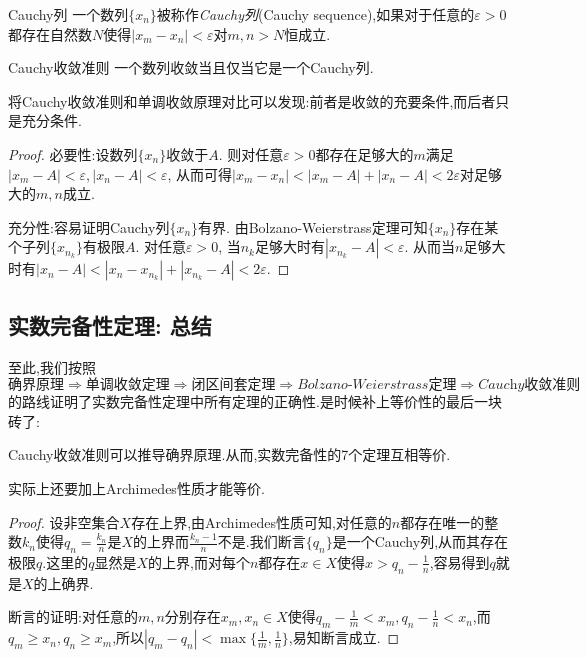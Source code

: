 \begin{definition}{Cauchy列}
	一个数列$\{ x_n \}$被称作\textit{Cauchy列}(Cauchy sequence),如果对于任意的$\varepsilon >0$都存在自然数$N$使得$|x_m-x_n|<\varepsilon$对$m,n>N$恒成立.
\end{definition}

\begin{theorem}{Cauchy收敛准则}
	一个数列收敛当且仅当它是一个Cauchy列.
\end{theorem}
\begin{remark}
	将Cauchy收敛准则和单调收敛原理对比可以发现:前者是收敛的充要条件,而后者只是充分条件.
\end{remark}
\begin{proof}
	必要性:设数列$\{ x_n \}$收敛于$A$. 则对任意$\varepsilon >0$都存在足够大的$m$满足$|x_m-A|<\varepsilon ,|x_n-A|<\varepsilon$, 从而可得$|x_m-x_n|<|x_m-A|+|x_n-A|<2\varepsilon$对足够大的$m,n$成立. 
	
	充分性:容易证明Cauchy列$\{ x_n \}$有界. 由Bolzano-Weierstrass定理可知$\{ x_n \}$存在某个子列$\{ x_{n_k} \}$有极限$A$. 对任意$\varepsilon >0$, 当$n_k$足够大时有$|x_{n_k} - A|<\varepsilon$. 从而当$n$足够大时有$|x_n-A|<|x_n-x_{n_k}|+|x_{n_k}-A|<2\varepsilon$. 
\end{proof}

\subsection{实数完备性定理: 总结}

至此,我们按照$$\textit{确界原理} \Rightarrow \textit{单调收敛定理} \Rightarrow \textit{闭区间套定理} \Rightarrow \textit{Bolzano-Weierstrass定理} \Rightarrow \textit{Cauchy收敛准则}$$的路线证明了实数完备性定理中所有定理的正确性.是时候补上等价性的最后一块砖了:

\begin{proposition}{}
	Cauchy收敛准则可以推导确界原理.从而,实数完备性的7个定理互相等价.
\end{proposition}
\begin{remark}
	实际上还要加上Archimedes性质才能等价. 
\end{remark}
\begin{proof}
	设非空集合$X$存在上界,由Archimedes性质可知,对任意的$n$都存在唯一的整数$k_n$使得$q_n=\frac{k_n}{n}$是$X$的上界而$\frac{k_n-1}{n}$不是.我们断言$\{ q_n \}$是一个Cauchy列,从而其存在极限$q$.这里的$q$显然是$X$的上界,而对每个$n$都存在$x \in X$使得$x>q_n-\frac{1}{n}$,容易得到$q$就是$X$的上确界.
	
	断言的证明:对任意的$m,n$分别存在$x_m,x_n \in X$使得$q_m-\frac{1}{m} < x_m,q_n-\frac{1}{n} < x_n$,而$q_m \geq x_n,q_n \geq x_m$,所以$|q_m-q_n|<\max \{ \frac{1}{m},\frac{1}{n} \}$,易知断言成立.
\end{proof}

